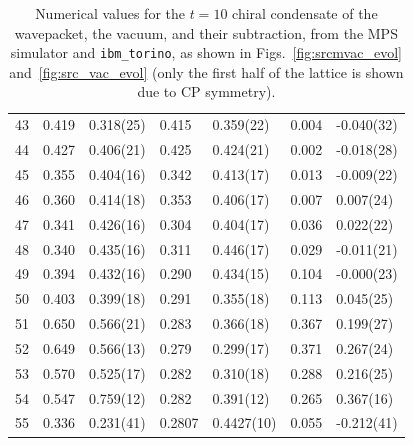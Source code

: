 \documentclass[aps, prc, tightenlines,superscriptaddress, letterpaper, amsmath, amssymb, preprintnumbers, floatfix, longbibliography, nofootinbib]{revtex4-2}
\begin{document}
\begin{table}[!htb]
{\begin{tabularx}{\textwidth}{| c || Y | Y | Y | Y | Y | Y |}
43	&	0.419	&	0.318(25)	&	0.415	&	0.359(22)	&	0.004	&	-0.040(32)	\\
44	&	0.427	&	0.406(21)	&	0.425	&	0.424(21)	&	0.002	&	-0.018(28)	\\
45	&	0.355	&	0.404(16)	&	0.342	&	0.413(17)	&	0.013	&	-0.009(22)	\\
46	&	0.360	&	0.414(18)	&	0.353	&	0.406(17)	&	0.007	&	0.007(24)	\\
47	&	0.341	&	0.426(16)	&	0.304	&	0.404(17)	&	0.036	&	0.022(22)	\\
48	&	0.340	&	0.435(16)	&	0.311	&	0.446(17)	&	0.029	&	-0.011(21)	\\
49	&	0.394	&	0.432(16)	&	0.290	&	0.434(15)	&	0.104	&	-0.000(23)	\\
50	&	0.403	&	0.399(18)	&	0.291	&	0.355(18)	&	0.113	&	0.045(25)	\\
51	&	0.650	&	0.566(21)	&	0.283	&	0.366(18)	&	0.367	&	0.199(27)	\\
52	&	0.649	&	0.566(13)	&	0.279	&	0.299(17)	&	0.371	&	0.267(24)	\\
53	&	0.570	&	0.525(17)	&	0.282	&	0.310(18)	&	0.288	&	0.216(25)	\\
54	&	0.547	&	0.759(12)	&	0.282	&	0.391(12)	&	0.265	&	0.367(16)	\\
55	&	0.336	&	0.231(41)	&	0.2807	&	0.4427(10)	&	0.055	&	-0.212(41)	\\ \hline
\end{tabularx}}
\caption{Numerical values for the $t=10$ chiral condensate of the wavepacket, the vacuum, and their subtraction, from the MPS simulator and {\tt ibm\_torino}, as shown in Figs.~\ref{fig:srcmvac_evol} and~\ref{fig:src_vac_evol} (only the first half of the lattice is shown due to CP symmetry).}
 \label{tab:tablet10}
\end{table}
%
\end{document}
